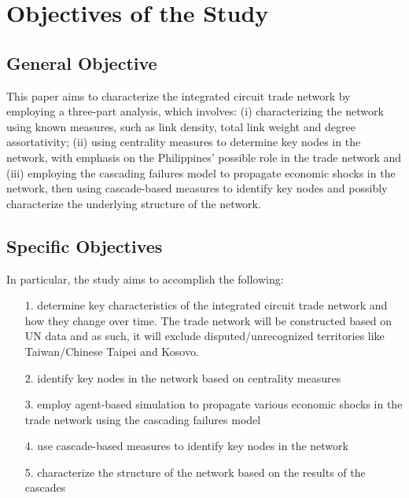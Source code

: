 \documentclass[12pt,letterpaper]{report}
\begin{document}
\section{Objectives of the Study}
\label{sec:12Objectives}

\subsection{General Objective}
\label{ssec:121GenObj}
		
		This paper aims to characterize the integrated circuit trade network by employing a three-part analysis, which involves: (i) characterizing the network using known measures, such as link density, total link weight and degree assortativity; (ii) using centrality measures to determine key nodes in the network, with emphasis on the Philippines’ possible role in the trade network and (iii) employing the cascading failures model to propagate economic shocks in the network, then using cascade-based measures to identify key nodes and possibly characterize the underlying structure of the network. 
		
\subsection{Specific Objectives}
\label{ssec:122SpecObj}
		
		In particular, the study aims to accomplish the following:
		
		\begin{itemize}
		
		\item [1.] determine key characteristics of the integrated circuit trade network and how they change over time. The trade network will be constructed based on UN data and as such, it will exclude disputed/unrecognized territories like Taiwan/Chinese Taipei and Kosovo.
		
		\item [2.] identify key nodes in the network based on centrality measures
		
		\item [3.] employ agent-based simulation to propagate various economic shocks in the trade network using the cascading failures model
		
		\item [4.] use cascade-based measures to identify key nodes in the network
		
		\item [5.] characterize the structure of the network based on the results of the cascades
		
		\end{itemize}
		
\end{document}
